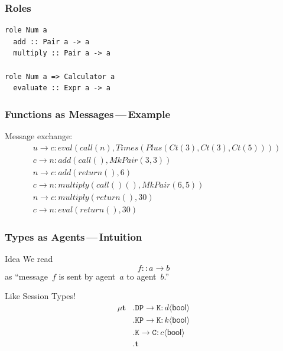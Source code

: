 \documentclass{beamer}
\begin{document}
\begin{frame}[fragile]
\frametitle{Roles}
\begin{lstlisting}
role Num a
  add :: Pair a -> a
  multiply :: Pair a -> a

role Num a => Calculator a
  evaluate :: Expr a -> a
\end{lstlisting}
\end{frame}

\begin{frame}[fragile]
\frametitle{Functions as Messages\,---\,Example}
Message exchange:
\begin{align*}
&u\to c: eval(call(n), Times(Plus(Ct(3), Ct(3), Ct(5))))\\
&c\to n: add(call(), MkPair(3,3))\\
&n\to c: add(return(),6)\\
&c\to n: multiply(call()(), MkPair(6,5))\\
&n\to c: multiply(return(), 30)\\
&c\to n: eval(return(), 30)
\end{align*}
\note[item]{}
\end{frame}

\begin{frame}[fragile]
\frametitle{Types as Agents\,---\,Intuition}
\begin{block}{Idea}
We read \[f :: a \to b\] as
``message~$f$ is sent by agent~$a$ to agent~$b$.''
\end{block}
\begin{block}{Like Session Types!}
\begin{align*}
\mu\mathbf{t}&.\mathtt{DP}\to\mathtt{K}:d\langle\mathsf{bool}\rangle \\
  &.\mathtt{KP}\to\mathtt{K}:k\langle\mathsf{bool}\rangle\\
  &.\mathtt{K}\to\mathtt{C}:c\langle\mathsf{bool}\rangle\\
  &.\mathbf{t}
\end{align*}
\end{block}
\note[item]{}
\end{frame}
\end{document}

